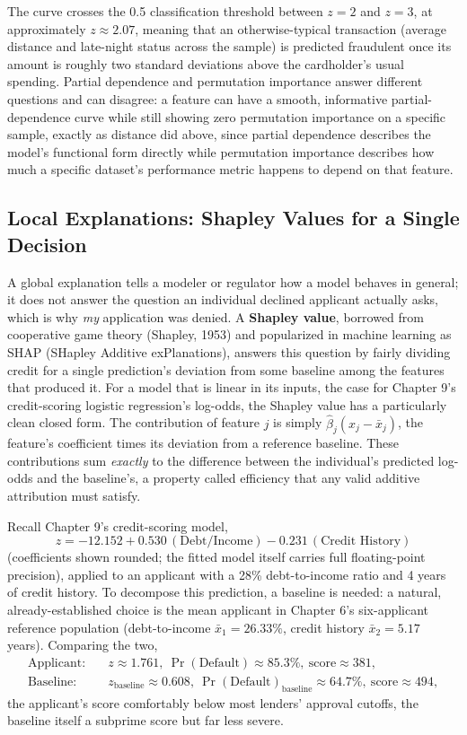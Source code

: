 \documentclass[../ai_in_finance]{subfiles}
\begin{document}
The curve crosses the 0.5 classification threshold between $z=2$ and $z=3$, at approximately $z \approx 2.07$, meaning that an otherwise-typical transaction (average distance and late-night status across the sample) is predicted fraudulent once its amount is roughly two standard deviations above the cardholder's usual spending. Partial dependence and permutation importance answer different questions and can disagree: a feature can have a smooth, informative partial-dependence curve while still showing zero permutation importance on a specific sample, exactly as distance did above, since partial dependence describes the model's functional form directly while permutation importance describes how much a specific dataset's performance metric happens to depend on that feature.

\subsection{Local Explanations: Shapley Values for a Single Decision}
\label{sec:shapley-explain}

A global explanation tells a modeler or regulator how a model behaves in general; it does not answer the question an individual declined applicant actually asks, which is why \emph{my} application was denied. A \textbf{Shapley value}, borrowed from cooperative game theory (Shapley, 1953) and popularized in machine learning as SHAP (SHapley Additive exPlanations), answers this question by fairly dividing credit for a single prediction's deviation from some baseline among the features that produced it. For a model that is linear in its inputs, the case for Chapter 9's credit-scoring logistic regression's log-odds, the Shapley value has a particularly clean closed form. The contribution of feature $j$ is simply $\hat\beta_j (x_j - \bar x_j)$, the feature's coefficient times its deviation from a reference baseline. These contributions sum \emph{exactly} to the difference between the individual's predicted log-odds and the baseline's, a property called efficiency that any valid additive attribution must satisfy.

Recall Chapter 9's credit-scoring model,
$$z = -12.152 + 0.530\,(\text{Debt/Income}) - 0.231\,(\text{Credit History})$$
(coefficients shown rounded; the fitted model itself carries full floating-point precision), applied to an applicant with a 28\% debt-to-income ratio and 4 years of credit history. To decompose this prediction, a baseline is needed: a natural, already-established choice is the mean applicant in Chapter 6's six-applicant reference population (debt-to-income $\bar x_1 = 26.33\%$, credit history $\bar x_2 = 5.17$ years). Comparing the two,
\begin{align*}
\text{Applicant:} &\quad z \approx 1.761, \ \Pr(\text{Default}) \approx 85.3\%, \ \text{score} \approx 381, \\
\text{Baseline:} &\quad z_{\text{baseline}} \approx 0.608, \ \Pr(\text{Default})_{\text{baseline}} \approx 64.7\%, \ \text{score} \approx 494,
\end{align*}
the applicant's score comfortably below most lenders' approval cutoffs, the baseline itself a subprime score but far less severe.
\end{document}
